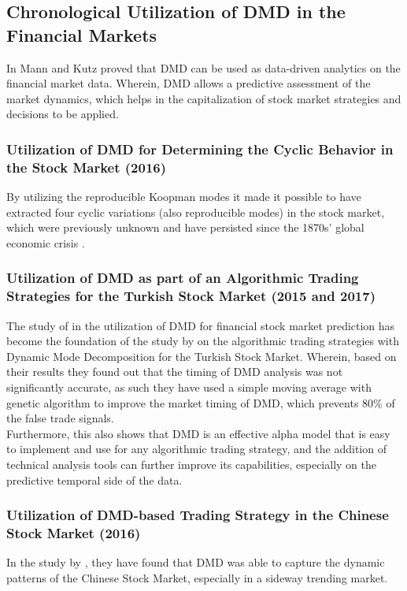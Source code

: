 \subsection{Chronological Utilization of DMD in the Financial Markets}
\label{subsec:chronological_utilization_dmd}
In \citeyear{Mann2015} Mann and Kutz proved that DMD can be used as data-driven analytics 
on the financial market data. Wherein, DMD allows a predictive assessment of 
the market dynamics, which helps in the capitalization of stock market 
strategies and decisions to be applied.

\subsubsection{Utilization of DMD for Determining the Cyclic Behavior in the Stock Market (2016)}
\label{subsubsec:dmd_cyclic_behavior}
By utilizing the reproducible Koopman modes it made it possible to have extracted 
four cyclic variations (also reproducible modes) in the stock market, which 
were previously unknown and have persisted since the 1870s’ 
global economic crisis
\cite{Hua2016,Williamson2015}.

\subsubsection{Utilization of DMD as part of an Algorithmic Trading Strategies for the Turkish Stock Market (2015 and 2017)}
\label{subsubsec:dmd_algorithmic_trading}
The study of  in the utilization of DMD for financial stock market 
prediction has become the foundation of the study by  
on the algorithmic trading strategies with Dynamic Mode Decomposition 
for the Turkish Stock Market. Wherein, based on their results they found out 
that the timing of DMD analysis was not significantly accurate, as such they 
have used a simple moving average with genetic algorithm to improve the market 
timing of DMD, which prevents 80\% of the false trade signals.
\hfill \\

Furthermore, this also shows that DMD is an effective alpha 
model that is easy to implement and use for any algorithmic trading 
strategy, and the addition of technical analysis tools can further improve 
its capabilities, especially on the predictive temporal side of the data.

\subsubsection{Utilization of DMD-based Trading Strategy in the Chinese Stock Market (2016)}
\label{subsubsec:dmd_chinese_stock_market}
In the study by , they have found that DMD was able to capture the 
dynamic patterns of the Chinese Stock Market, especially in a sideway trending market.
\hfill \\

